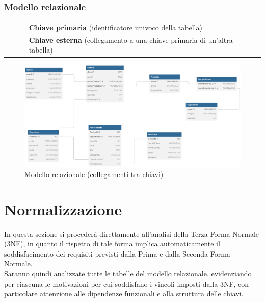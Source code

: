 \documentclass[12pt,a4paper]{article}
\begin{document}
    \newpage
    \subsubsection{Modello relazionale}
    \begin{tcolorbox}[
        colback=gray!8,  
        colframe=darkgray, 
        title=Legenda del modello relazionale
    ]
        \begin{tabular}{@{} >{\centering\arraybackslash}m{0.5cm} p{14cm} @{}}
            \includegraphics[width=0.025\textwidth]{figures/g132.pdf} & \textbf{Chiave primaria} (identificatore univoco della tabella) \\
            \addlinespace[0.5em]
            \includegraphics[width=0.025\textwidth]{figures/path621.pdf} & \textbf{Chiave esterna} (collegamento a una chiave primaria di un'altra tabella) \\ 
        \end{tabular}
    \end{tcolorbox}  
     
    \begin{figure}[H]
        \centering 
        \vspace{-10pt}  %
        \includegraphics[width=\textwidth]{figures/Relational_model.pdf}
        \vspace{-20pt}  %
        \caption{Modello relazionale (collegamenti tra chiavi)}
    \end{figure}  

    \newpage
    \section{Normalizzazione}
    In questa sezione si procederà direttamente all'analisi della Terza Forma Normale (3NF), in quanto il rispetto di tale forma implica automaticamente il soddisfacimento dei requisiti previsti dalla Prima e dalla Seconda Forma Normale. \\
    Saranno quindi analizzate tutte le tabelle del modello relazionale, evidenziando per ciascuna le motivazioni per cui soddisfano i vincoli imposti dalla 3NF, con particolare attenzione alle dipendenze funzionali e alla struttura delle chiavi.
\end{document}
